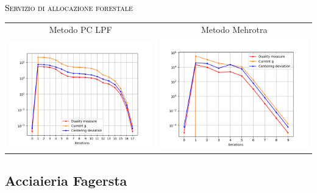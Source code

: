\begin{frame}{\textsc{\LARGE \textcolor{black}{Servizio di allocazione forestale}}}
	\centering
	\begin{tabular}{c@{}c}
		\small{Metodo PC LPF} & \small{Metodo Mehrotra} \\
		\includegraphics[scale = 0.33]{for_PCLPF}
		&\includegraphics[scale = 0.33]{for_MER}\\ 
	\end{tabular}
\end{frame}


\subsection{Acciaieria Fagersta}


